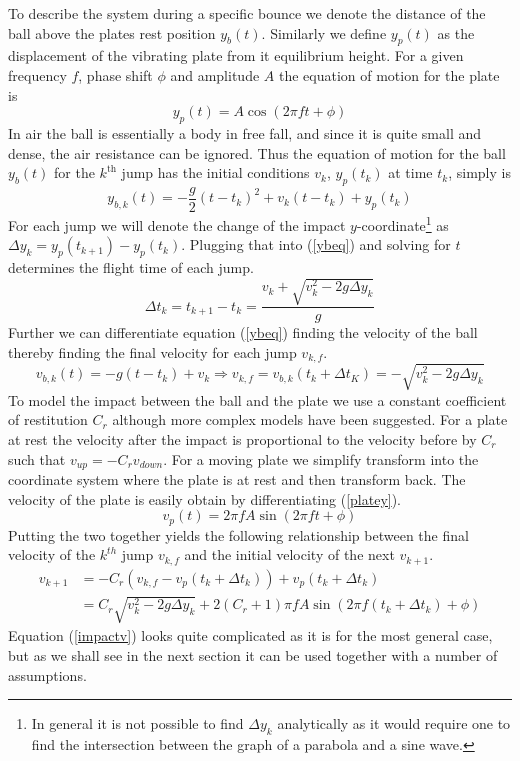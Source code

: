 \documentclass[12pt,oneside,a4paper]{article}
\numberwithin{equation}{section}
\begin{document}
{{{{To describe the system during a specific bounce we denote the distance of the ball above the plates rest position $y_b(t)$. Similarly we define $y_p(t)$ as the displacement of the vibrating  plate from it equilibrium height. For a given frequency $f$, phase shift $\phi$ and amplitude $A$ the equation of motion for the plate is
\begin{equation}
	y_p(t)= A \cos(2\pi f t+ \phi)
	\label{platey}
\end{equation}
In air the ball is essentially a body in free fall, and since it is quite small and dense, the air resistance can be ignored. Thus the equation of motion for the ball $y_b(t)$ for the $k^\text{th}$ jump has the initial conditions $v_k$, $y_p(t_k)$ at time $t_k$, simply is
\begin{equation}
	y_{b,k}(t) = -\frac{g}{2}(t-t_k)^2+v_k(t-t_k)+y_p(t_k)
	\label{ybeq}
\end{equation}
For each jump we will denote the change of the impact $y$-coordinate\footnote{In general it is not possible to find $\Delta y_k$ analytically as it would require one to find the intersection between the graph of a parabola and a sine wave.} as $\Delta y_{k}=y_p(t_{k+1})-y_p(t_{k})$. Plugging that into (\ref{ybeq}) and solving for $t$ determines the flight time of each jump.
\begin{equation}
	\Delta t_{k} = t_{k+1}-t_{k} = \frac{v_{k}+\sqrt{v_k^2-2g\Delta y_k}}{g}
	\label{flytime}
\end{equation}
Further we can differentiate equation (\ref{ybeq}) finding the velocity of the ball thereby finding the final velocity for each jump $v_{k,f}$.
\begin{equation}
	v_{b,k}(t) = -g(t-t_k)+v_k \Rightarrow v_{k,f} = v_{b,k}(t_k+\Delta t_K) = -\sqrt{v_k^2-2g\Delta y_k}
\end{equation}
To model the impact between the ball and the plate we use a constant coefficient of restitution $C_r$ although more complex models have been suggested\cite{muller}. For a plate at rest the velocity after the impact is proportional to the velocity before by $C_r$ such that $v_{up}=-C_r v_{down}$. For a moving plate we simplify transform into the coordinate system where the plate is at rest and then transform back. The velocity of the plate is easily obtain by differentiating (\ref{platey}).
\begin{equation}
	v_p(t) = 2\pi f A \sin(2\pi f t+ \phi)
	\label{platev}
\end{equation}
Putting the two together yields the following relationship between the final velocity of the $k^{th}$ jump $v_{k,f}$ and the initial velocity of the next $v_{k+1}$.
\begin{align}
	v_{k+1} &= -C_r(v_{k,f}-v_p(t_k+\Delta t_k))+v_p(t_k+\Delta t_k) \nonumber \\
	&= C_r \sqrt{v_k^2-2g\Delta y_k}+2(C_r+1)\pi f A \sin(2\pi f (t_k+\Delta t_k)+ \phi) \label{impactv}
\end{align}
Equation (\ref{impactv}) looks quite complicated as it is for the most general case, but as we shall see in the next section it can be used together with a number of assumptions.

}}}}
\end{document}
